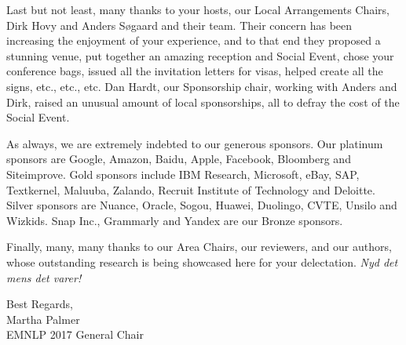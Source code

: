 Last but not least, many thanks to your hosts, our Local Arrangements Chairs, Dirk Hovy and Anders Søgaard and their team.  Their concern has been increasing the enjoyment of your experience, and to that end they proposed a stunning venue, put together an amazing reception and Social Event, chose your conference bags, issued all the invitation letters for visas, helped create all the signs, etc., etc., etc.  Dan Hardt, our Sponsorship chair, working with Anders and Dirk, raised an unusual amount of local sponsorships, all to defray the cost of the Social Event.

As always, we are extremely indebted to our generous sponsors. Our platinum sponsors are Google, Amazon, Baidu, Apple, Facebook, Bloomberg and Siteimprove.  Gold sponsors include IBM Research, Microsoft, eBay, SAP, Textkernel, Maluuba, Zalando, Recruit Institute of Technology and Deloitte.  Silver sponsors are Nuance, Oracle, Sogou, Huawei, Duolingo, CVTE, Unsilo and Wizkids. Snap Inc., Grammarly and Yandex are our Bronze sponsors.

Finally, many, many thanks to our Area Chairs, our reviewers, and our authors, whose outstanding research is being showcased here for your delectation. \textit{Nyd det mens det varer!}

\vspace{3em}
\noindent
Best Regards,\\
Martha Palmer\\
EMNLP 2017 General Chair



